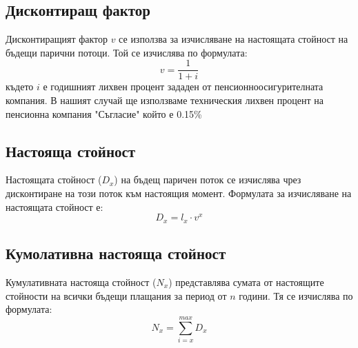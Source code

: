 \documentclass[a4paper,12pt]{article}
\begin{document}
\subsection{Дисконтиращ фактор}
Дисконтиращият фактор $v$ се използва за изчисляване на настоящата стойност на бъдещи парични потоци. Той се изчислява по формулата:
\[v = \frac{1}{1+i}\]
където $i$ е годишният лихвен процент зададен от пенсионноосигурителната компания. В нашият случай ще използваме техническия лихвен процент на пенсионна компания "Съгласие" който е 0.15\% \cite{DKFN_Pensions}
\subsection{Настояща стойност}
Настоящата стойност ($D_x$) на бъдещ паричен поток се изчислява чрез дисконтиране на този поток към настоящия момент. Формулата за изчисляване на настоящата стойност е:
\[D_x = l_x\cdot v^x\]
\subsection{Кумолативна настояща стойност}
Кумулативната настояща стойност ($N_x$) представлява сумата от настоящите стойности на всички бъдещи плащания за период от $n$ години. Тя се изчислява по формулата:
\[N_x = \sum_{i=x}^{max}D_x\]
\end{document}

